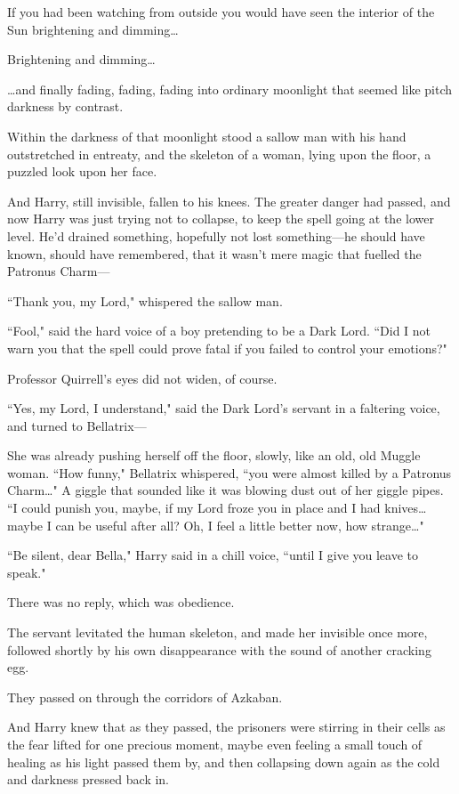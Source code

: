 If you had been watching from outside you would have seen the interior of the Sun brightening and dimming…

Brightening and dimming…

…and finally fading, fading, fading into ordinary moonlight that seemed like pitch darkness by contrast.

Within the darkness of that moonlight stood a sallow man with his hand outstretched in entreaty, and the skeleton of a woman, lying upon the floor, a puzzled look upon her face.

And Harry, still invisible, fallen to his knees. The greater danger had passed, and now Harry was just trying not to collapse, to keep the spell going at the lower level. He'd drained something, hopefully not lost something—he should have known, should have remembered, that it wasn't mere magic that fuelled the Patronus Charm—

``Thank you, my Lord," whispered the sallow man.

``Fool," said the hard voice of a boy pretending to be a Dark Lord. ``Did I not warn you that the spell could prove fatal if you failed to control your emotions?"

Professor Quirrell's eyes did not widen, of course.

``Yes, my Lord, I understand," said the Dark Lord's servant in a faltering voice, and turned to Bellatrix—

She was already pushing herself off the floor, slowly, like an old, old Muggle woman. ``How funny," Bellatrix whispered, ``you were almost killed by a Patronus Charm…" A giggle that sounded like it was blowing dust out of her giggle pipes. ``I could punish you, maybe, if my Lord froze you in place and I had knives…maybe I can be useful after all? Oh, I feel a little better now, how strange…"

``Be silent, dear Bella," Harry said in a chill voice, ``until I give you leave to speak."

There was no reply, which was obedience.

The servant levitated the human skeleton, and made her invisible once more, followed shortly by his own disappearance with the sound of another cracking egg.

They passed on through the corridors of Azkaban.

And Harry knew that as they passed, the prisoners were stirring in their cells as the fear lifted for one precious moment, maybe even feeling a small touch of healing as his light passed them by, and then collapsing down again as the cold and darkness pressed back in.

